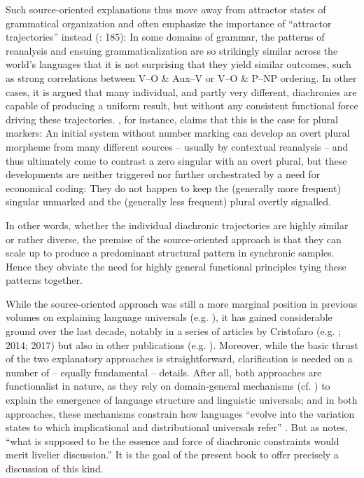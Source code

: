 \documentclass[output=paper]{langsci/langscibook}
\begin{document}
Such source-oriented explanations thus move away from attractor states of grammatical organization and often emphasize the importance of “attractor trajectories” instead (\citealt{BybeeBeckner2015}: 185): In some domains of grammar, the patterns of reanalysis and ensuing grammaticalization are so strikingly similar across the world’s languages that it is not surprising that they yield similar outcomes, such as strong correlations between V–O \& Aux–V or V–O \& P–NP ordering. In other cases, it is argued that many individual, and partly very different, diachronies are capable of producing a uniform result, but without any consistent functional force driving these trajectories. \citet{Cristofaro2017}, for instance, claims that this is the case for plural markers: An initial system without number marking can develop an overt plural morpheme from many different sources – usually by contextual reanalysis – and thus ultimately come to contrast a zero singular with an overt plural, but these developments are neither triggered nor further orchestrated by a need for economical coding: They do not happen to keep the (generally more frequent) singular unmarked and the (generally less frequent) plural overtly signalled. 

In other words, whether the individual diachronic trajectories are highly similar or rather diverse, the premise of the source-oriented approach is that they can scale up to produce a predominant structural pattern in synchronic samples. Hence they obviate the need for highly general functional principles tying these patterns together.

While the source-oriented approach was still a more marginal position in previous volumes on explaining language universals (e.g. \citealt{Hawkins1988a,Good2008}), it has gained considerable ground over the last decade, notably in a series of articles by Cristofaro (e.g. \citealt{Cristofaro2012}; 2014; 2017) but also in other publications (e.g. \citealt{Creissels2008,GildeaZúñiga2016}). Moreover, while the basic thrust of the two explanatory approaches is straightforward, clarification is needed on a number of – equally fundamental – details. After all, both approaches are functionalist in nature, as they rely on domain-general mechanisms (cf. \citealt{Bybee2010}) to explain the emergence of language structure and linguistic universals; and in both approaches, these mechanisms constrain how languages “evolve into the variation states to which implicational and distributional universals refer” \citep[18]{Hawkins1988b}. But as \citet[51]{Plank2007} notes, “what is supposed to be the essence and force of diachronic constraints would merit livelier discussion.” It is the goal of the present book to offer precisely a discussion of this kind.
\end{document}
